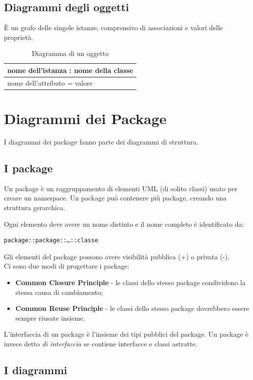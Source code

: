 \subsection{Diagrammi degli oggetti}
\`E un grafo delle singole istanze, comprensivo di associazioni e valori delle proprietà.

\begin{table}[H]
\centering
\begin{tabular}{|l|}
\hline
nome dell'istanza : nome della classe \\
\hline
nome dell'attributo = valore \\
\hline
\end{tabular}
\caption{Diagramma di un oggetto}
\end{table}

\section{Diagrammi dei Package}
I diagrammi dei package fanno parte dei diagrammi di struttura. 

\subsection{I package}
Un package è un raggruppamento di elementi UML (di solito classi) usato per creare un namespace.
Un package può contenere più package, creando una struttura gerarchica.

Ogni elemento deve avere un nome distinto e il nome completo è identificato da:
\begin{verbatim}
package::package::…::classe
\end{verbatim}
Gli elementi del package possono avere visibilità pubblica (+) o privata (-). \\
Ci sono due modi di progettare i package:
\begin{itemize}
\item \textbf{Common Closure Principle} - le classi dello stesso package condividono la stessa causa di cambiamento;
\item \textbf{Common Reuse Principle} - le classi dello stesso package dovrebbero essere sempre riusate insieme.
\end{itemize}
L'interfaccia di un package è l'insieme dei tipi pubblici del package.
Un package è invece detto \textit{di interfaccia} se contiene interfacce e classi astratte. 


\subsection{I diagrammi}

